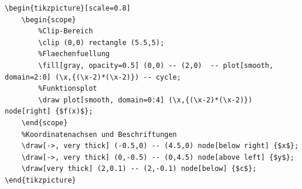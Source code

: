\begin{lstlisting}[style=latex]
\begin{tikzpicture}[scale=0.8]
	\begin{scope}
		%Clip-Bereich
		\clip (0,0) rectangle (5.5,5);
		%Flaechenfuellung
		\fill[gray, opacity=0.5] (0,0) -- (2,0)  -- plot[smooth, domain=2:0] (\x,{(\x-2)*(\x-2)}) -- cycle;
		%Funktionsplot
		\draw plot[smooth, domain=0:4] (\x,{(\x-2)*(\x-2)}) node[right] {$f(x)$};
	\end{scope}
	%Koordinatenachsen und Beschriftungen
	\draw[->, very thick] (-0.5,0) -- (4.5,0) node[below right] {$x$};
	\draw[->, very thick] (0,-0.5) -- (0,4.5) node[above left] {$y$};
	\draw[very thick] (2,0.1) -- (2,-0.1) node[below] {$c$};
\end{tikzpicture}
\end{lstlisting}

